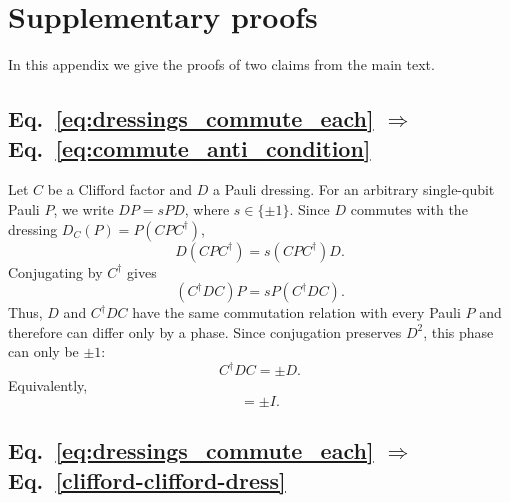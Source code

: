 \documentclass[
 reprint,
 amsmath,amssymb,
 pra,superscriptaddress, nofootinbib
]{revtex4-2}
\theoremstyle{definition}
\theoremstyle{plain}
\begin{document}
\clearpage
\section{Supplementary proofs}
\label{app:proofs}
In this appendix we give the proofs of two claims from the main text. 

\subsection{
  \texorpdfstring{
    Eq.~\eqref{eq:dressings_commute_each}
    $\Longrightarrow$
    Eq.~\eqref{eq:commute_anti_condition}
  }{
    Eq. (\ref*{eq:dressings_commute_each})
    => Eq. (\ref*{eq:commute_anti_condition})
  }
}
Let $C$ be a Clifford factor and $D$ a Pauli dressing. For an arbitrary single-qubit Pauli $P$, we write $DP=sPD$, where $s\in\{\pm1\}$. Since $D$ commutes with
the dressing $D_C(P)=P(CPC^\dagger)$,
\begin{equation}
  D(CPC^\dagger)=s(CPC^\dagger)D.
\end{equation}
Conjugating by $C^\dagger$ gives
\begin{equation}
  (C^\dagger DC)P=sP(C^\dagger DC).
\end{equation}
Thus, $D$ and $C^\dagger DC$ have the same commutation relation with
every Pauli $P$ and therefore can differ only by a phase.
Since conjugation preserves $D^2$, this phase can only be $\pm1$:
\begin{equation}
  C^\dagger DC=\pm D.
\end{equation}
Equivalently,
\begin{equation}
[C,D]=\pm I.
\end{equation}

\subsection{
  \texorpdfstring{
    Eq.~\eqref{eq:dressings_commute_each}
    $\Longrightarrow$
    Eq.~\eqref{clifford-clifford-dress}
  }{
    Eq. (\ref*{eq:dressings_commute_each})
    => Eq. (\ref*{clifford-clifford-dress})
  }
}
\end{document}
